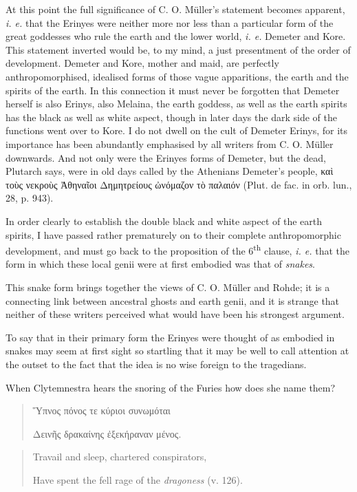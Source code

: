 \documentclass[a4paper, 11pt, oneside, polutonikogreek, english]{article}
\begin{document}
At this point the full significance of C. O. Müller's statement becomes apparent, \emph{i. e.} that the Erinyes were neither more nor less than a particular form of the great goddesses who rule the earth and the lower world, \emph{i. e.} Demeter and Kore. This statement inverted would be, to my mind, a just presentment of the order of development. Demeter and Kore, mother and maid, are perfectly anthropomorphised, idealised forms of those vague apparitions, the earth and the spirits of the earth. In this connection it must never be forgotten that Demeter herself is also Erinys, also Melaina, the earth goddess, as well as the earth spirits has the black as well as white aspect, though in later days the dark side of the functions went over to Kore. I do not dwell on the cult of Demeter Erinys, for its importance has been abundantly emphasised by all writers from C. O. Müller downwards. And not only were the Erinyes forms of Demeter, but the dead, Plutarch says, were in old days called by the Athenians Demeter's people, καὶ τοὺς νεκροὺς Ἀθηναῖοι Δημητρείους ὠνόμαζον τὸ παλαιόν (Plut. de fac. in orb. lun., 28, p. 943).

In order clearly to establish the double black and white aspect of the earth spirits, I have passed rather prematurely on to their complete anthropomorphic development, and must go back to the proposition of the 6\textsuperscript{th} clause, \emph{i. e.} that the form in which these local genii were at first embodied was that of \emph{snakes}.

This snake form brings together the views of C. O. Müller and Rohde; it is a connecting link between ancestral ghosts and earth genii, and it is strange that neither of these writers perceived what would have been his strongest argument.

To say that in their primary form the Erinyes were thought of as embodied in snakes may seem at first sight so startling that it may be well to call attention at the outset to the fact that the idea is no wise foreign to the tragedians.

When Clytemnestra hears the snoring of the Furies how does she name them?
\begin{quotation}
Ὕπνος πόνος τε κύριοι συνωμόται

Δεινῆς δρακαίνης ἐξεκήραναν μένος.
\end{quotation}
\begin{quotation}
Travail and sleep, chartered conspirators,

Have spent the fell rage of the \emph{dragoness} (v. 126).
\end{quotation}
\end{document}
